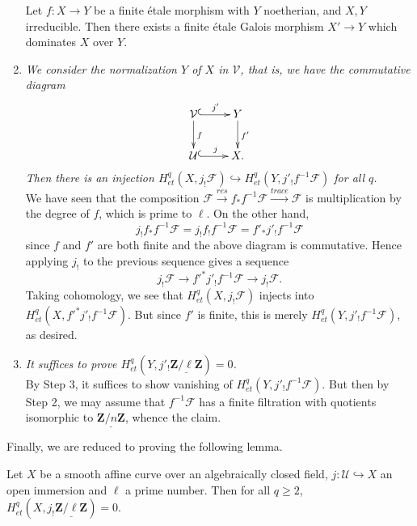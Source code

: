 \begin{enumerate}
\begin{exercise}
Let $f: X \to Y$ be a finite \'etale morphism with $Y$ noetherian, and $X, Y$ irreducible. Then there exists a finite \'etale Galois morphism $X' \to Y$ which dominates $X$ over $Y$.
\end{exercise}
\item
{\it We consider the normalization $Y$ of $X$ in $\mathcal{V}$, that is, we have the commutative diagram
$$
\xymatrix{
\mathcal{V} \ar^{f}[d] \ar^{j'}@{^{(}->}[r] & Y \ar^{f'}[d] \\
\mathcal{U} \ar^{j}@{^{(}->}[r] & X.
}
$$
Then there is an injection $H_{et}^q(X, j_!\mathcal{F}) \hookrightarrow H_{et}^q(Y, j'_! f^{-1} \mathcal{F})$ for all $q$.}
\\
We have seen that the composition $\mathcal{F} \xrightarrow{res} f_* f^{-1} \mathcal{F} \xrightarrow{trace} \mathcal{F}$ is multiplication by the degree of $f$, which is prime to $\ell$. On the other hand, 
$$
j_! f_* f^{-1} \mathcal{F} = j_! f_! f^{-1} \mathcal{F} = f'_* j'_! f^{-1}\mathcal{F}
$$ 
since $f$ and $f'$ are both finite and the above diagram is commutative. Hence applying $j_!$ to the previous sequence gives a sequence
$$
j_! \mathcal{F} \longrightarrow f'^* j'_! f^{-1} \mathcal{F} \longrightarrow j_! \mathcal{F}.
$$
Taking cohomology,  we see that  $H_{et}^q(X, j_!\mathcal{F})$ injects into $H_{et}^q( X , f'^* j'_! f^{-1} \mathcal{F})$. But since $f'$ is finite, this is merely $H_{et}^q( Y,  j'_! f^{-1} \mathcal{F})$, as desired.
\item
{\it It suffices to prove $H_{et}^q (Y, j'_! \underline{\mathbf{Z}/\ell\mathbf{Z}}) = 0$.}
\\
By Step 3, it suffices to show vanishing of $H_{et}^q( Y,  j'_! f^{-1} \mathcal{F})$. But then by Step 2, we may assume that $f^{-1}\mathcal{F}$ has a finite filtration with quotients isomorphic to $\underline{\mathbf{Z}/n\mathbf{Z}}$, whence the claim.
\end{enumerate}

Finally, we are reduced to proving the following lemma.

\begin{lemma} 
Let $X$ be a smooth affine curve over an algebraically closed field, $j: \mathcal{U} \hookrightarrow X$ an open immersion and $\ell$ a prime number. Then for all $q \geq 2$, $H_{et}^q(X, j_! \underline{\mathbf{Z}/\ell\mathbf{Z}}) = 0$.
\end{lemma}

